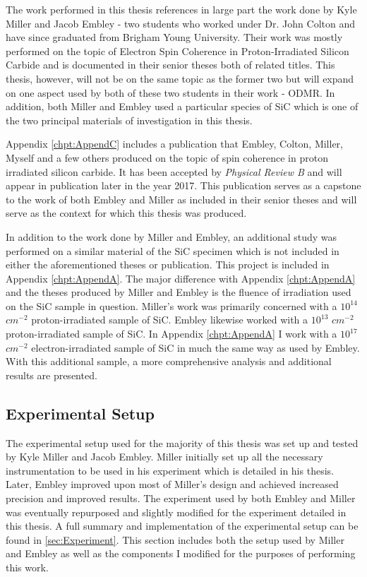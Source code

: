 \documentclass[oneside, astronomy, noacknowlegments]{BYUPhys}
\begin{document}
The work performed in this thesis references in large part the work done by Kyle Miller and Jacob Embley - two students who worked under Dr. John Colton and have since graduated from Brigham Young University. Their work was mostly performed on the topic of Electron Spin Coherence in Proton-Irradiated Silicon Carbide and is documented in their senior theses both of related titles. This thesis, however, will not be on the same topic as the former two but will expand on one aspect used by both of these two students in their work - ODMR. In addition, both Miller and Embley used a particular species of SiC which is one of the two principal materials of investigation in this thesis.

Appendix \ref{chpt:AppendC} includes a publication that Embley, Colton, Miller, Myself and a few others produced on the topic of spin coherence in proton irradiated silicon carbide. It has been accepted by \textit{Physical Review B} and will appear in publication later in the year 2017. This publication serves as a capstone to the work of both Embley and Miller as included in their senior theses and will serve as the context for which this thesis was produced.

In addition to the work done by Miller and Embley, an additional study was performed on a similar material of the SiC specimen which is not included in either the aforementioned theses or publication. This project is included in Appendix \ref{chpt:AppendA}. The major difference with Appendix \ref{chpt:AppendA} and the theses produced by Miller and Embley is the fluence of irradiation used on the SiC sample in question. Miller's work was primarily concerned with a $10^{14}$ $cm^{-2}$ proton-irradiated sample of SiC. Embley likewise worked with a $10^{13}$ $cm^{-2}$ proton-irradiated sample of SiC. In Appendix \ref{chpt:AppendA} I work with a $10^{17}$ $cm^{-2}$ electron-irradiated sample of SiC in much the same way as used by Embley. With this additional sample, a more comprehensive analysis and additional results are presented.

\subsection{Experimental Setup}

The experimental setup used for the majority of this thesis was set up and tested by Kyle Miller and Jacob Embley. Miller initially set up all the necessary instrumentation to be used in his experiment which is detailed in his thesis. Later, Embley improved upon most of Miller's design and achieved increased precision and improved results. The experiment used by both Embley and Miller was eventually repurposed and slightly modified for the experiment detailed in this thesis. A full summary and implementation of the experimental setup can be found in \ref{sec:Experiment}. This section includes both the setup used by Miller and Embley as well as the components I modified for the purposes of performing this work.
\end{document}
